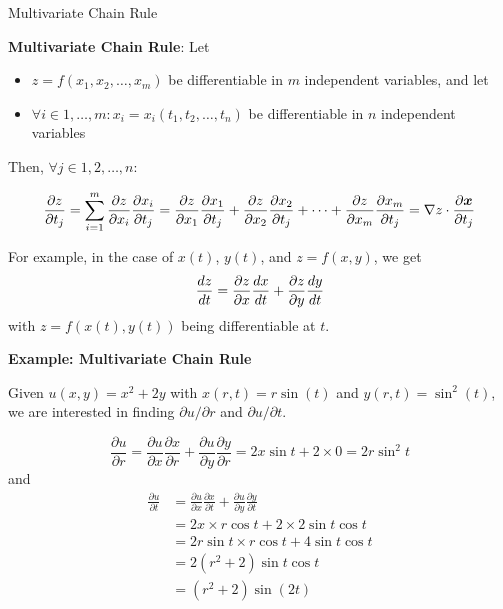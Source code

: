\begin{frame}{Multivariate Chain Rule}
    \begin{boxed}
        \textbf{Multivariate Chain Rule}:
        Let
        \begin{itemize}
            \item $z=f(x_1,x_2,\ldots,x_m)$ be differentiable in $m$ independent variables, and let
            \item $\forall i \in 1, \ldots,m: x_i=x_i(t_1,t_2,\dots,t_n)$ be differentiable in
                  $n$ independent variables
        \end{itemize}

        Then, $\forall j \in 1,2,\ldots,n$:

        $${\partial z \over \partial t_j} =
            \sum_{i = 1}^m {\partial z \over \partial x_i } { \partial x_i \over \partial t_j }
            =
            { \partial z \over \partial x_1 } {\partial x_1 \over \partial t_j}
            + { \partial z \over \partial x_2 } {\partial x_2 \over \partial t_j} + \cdots
            + { \partial z \over \partial x_m } {\partial x_m \over \partial t_j}
            = \nabla z \cdot {\partial \bm{x} \over \partial t_j }
        $$
    \end{boxed}

    For example, in the case of $x(t)$, $y(t)$, and $z=f(x,y)$, we get
    $${dz \over dt} = {\partial z \over \partial x} {dx \over dt} + {\partial z \over \partial y} {dy \over dt}$$
    with $z=f(x(t),y(t))$ being differentiable at $t$.
\end{frame}

\begin{frame}
    \textbf{Example: Multivariate Chain Rule}

    Given $u(x, y) = x^2 + 2y$ with $x(r, t) = r \sin(t)$ and $y(r,t) = \sin^2(t)$, we are interested in
    finding $\partial u / \partial r$ and $\partial u / \partial t$.

    $$\frac{\partial u}{\partial r}
        =\frac{\partial u}{\partial x} \frac{\partial x}{\partial r}+\frac{\partial u}{\partial y} \frac{\partial y}{\partial r}
        =2x \sin t + 2 \times 0 = 2 r \sin^2 t$$
    and
    \begin{align*}
        \frac{\partial u}{\partial t} & = \frac{\partial u}{\partial x} \frac{\partial x}{\partial t}+\frac{\partial u}{\partial y} \frac{\partial y}{\partial t} \\
                                      & = 2x \times r\cos t + 2 \times  2 \sin t \cos t                                                                           \\
                                      & = 2r \sin t \times  r \cos t + 4 \sin t \cos t                                                                            \\
                                      & = 2(r^2 + 2) \sin t \cos t                                                                                                \\
                                      & = (r^2 + 2) \sin(2t)
    \end{align*}
\end{frame}

